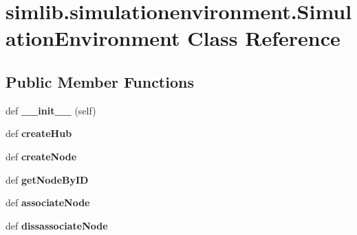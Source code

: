 \hypertarget{classsimlib_1_1simulationenvironment_1_1_simulation_environment}{}\section{simlib.\+simulationenvironment.\+Simulation\+Environment Class Reference}
\label{classsimlib_1_1simulationenvironment_1_1_simulation_environment}
\subsection*{Public Member Functions}
\begin{DoxyCompactItemize}
\item 
\mbox{\label{classsimlib_1_1simulationenvironment_1_1_simulation_environment_a9523fb72f109de5e544efb6569f25b87}} 
def {\bfseries \+\_\+\+\_\+init\+\_\+\+\_\+} (self)
\item 
\mbox{\label{classsimlib_1_1simulationenvironment_1_1_simulation_environment_a3663bc786f6efdb0fbeee270a89a5a09}} 
def {\bfseries create\+Hub}
\item 
\mbox{\label{classsimlib_1_1simulationenvironment_1_1_simulation_environment_ae52e6b7ff377e9e19a42522cd556f810}} 
def {\bfseries create\+Node}
\item 
\mbox{\label{classsimlib_1_1simulationenvironment_1_1_simulation_environment_a0ea1e1aed37d20521f1cd4a5fe45f304}} 
def {\bfseries get\+Node\+By\+ID}
\item 
\mbox{\label{classsimlib_1_1simulationenvironment_1_1_simulation_environment_a300a94d4dcc67723f7a35c75bf17290d}} 
def {\bfseries associate\+Node}
\item 
\mbox{\label{classsimlib_1_1simulationenvironment_1_1_simulation_environment_aeb0cf01f00d59cfdbd111e4ddae5c111}} 
def {\bfseries dissassociate\+Node}

\end{DoxyCompactItemize}
